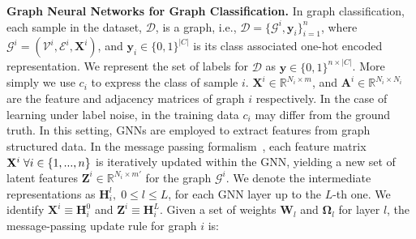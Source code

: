 \textbf{Graph Neural Networks for Graph Classification. }In graph classification, each sample in the dataset, $\mathcal{D}$, is a graph, i.e.,  $\mathcal{D} = \{\mathcal{G}^{i}, \mathbf{y}_i\}_{i = 1}^{n}$, where $\mathcal{G}^{i} = (\mathcal{V}^i, \mathcal{E}^i, \mathbf{X}^i)$, and $\mathbf{y}_i \in \{0, 1\}^{|C|}$ is its class associated one-hot encoded representation.
We represent the set of labels for $\mathcal{D}$ as $\mathbf{y} \in \{0, 1\}^{n \times |C|}$. More simply we use $c_i$ to express the class of sample $i$. $\mathbf{X}^i \in \mathbb{R}^{N_i \times m}$, and $\mathbf{A}^i \in \mathbb{R}^{N_i \times N_i}$ are the feature and adjacency matrices of graph $i$ respectively.
In the case of learning under label noise, in the training data $c_i$ may differ from the ground truth. In this setting, GNNs are employed to extract features from graph structured data. In the message passing formalism~\citet{messagepassing}, each feature matrix $\mathbf{X}^i \hspace{0.1cm} \forall i \in \{1, ..., n\}$ is iteratively updated within the GNN, yielding a new set of latent features $\mathbf{Z}^i \in \mathbb{R}^{N_i \times m'}$ for the graph $\mathcal{G}^i$. We denote the intermediate representations as $\mathbf{H}_i^l,\; 0 \leq l \leq L$, for each GNN layer up to the $L$-th one. We identify $\mathbf{X}^i \equiv \mathbf{H}^0_i$ and $\mathbf{Z}^i \equiv \mathbf{H}^L_i$. Given a set of weights $\mathbf{W}_l$ and $\mathbf{\Omega}_l$ for layer $l$, the message-passing update rule for graph $i$ is:
